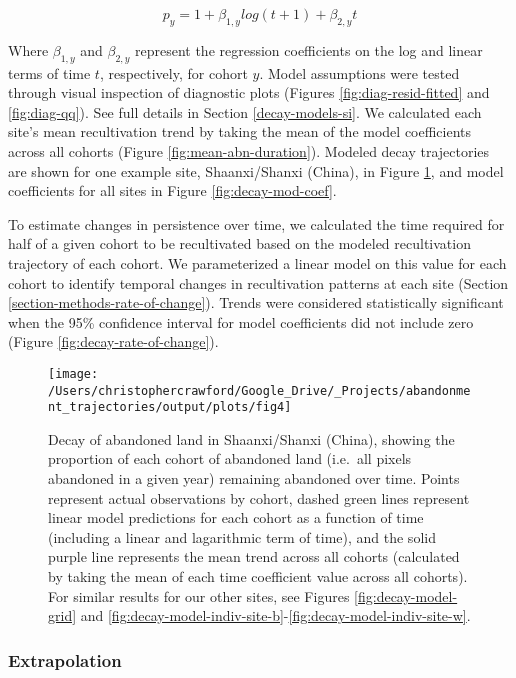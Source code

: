 \documentclass[9pt,twocolumn,twoside,]{pnas-new}
\begin{document}
\begin{equation}
p_{y} = 1 + \beta_{1,y} log(t + 1) + \beta_{2,y} t \label{eq:mod-spec}
\end{equation}

Where \(\beta_{1,y}\) and \(\beta_{2,y}\) represent the regression coefficients on the log and linear terms of time \(t\), respectively, for cohort \(y\).
Model assumptions were tested through visual inspection of diagnostic plots (Figures \ref{fig:diag-resid-fitted} and \ref{fig:diag-qq}).
See full details in Section \ref{decay-models-si}.
We calculated each site's mean recultivation trend by taking the mean of the model coefficients across all cohorts (Figure \ref{fig:mean-abn-duration}).
Modeled decay trajectories are shown for one example site, Shaanxi/Shanxi (China), in Figure \ref{fig:abn-decay-s}, and model coefficients for all sites in Figure \ref{fig:decay-mod-coef}.

To estimate changes in persistence over time, we calculated the time required for half of a given cohort to be recultivated based on the modeled recultivation trajectory of each cohort.
We parameterized a linear model on this value for each cohort to identify temporal changes in recultivation patterns at each site (Section \ref{section-methods-rate-of-change}).
Trends were considered statistically significant when the 95\% confidence interval for model coefficients did not include zero (Figure \ref{fig:decay-rate-of-change}).



\begin{figure}
\texttt{[image: /Users/christophercrawford/Google\_Drive/\_Projects/abandonment\_trajectories/output/plots/fig4]} \caption{Decay of abandoned land in Shaanxi/Shanxi (China), showing the proportion of each cohort of abandoned land (i.e.~all pixels abandoned in a given year) remaining abandoned over time. Points represent actual observations by cohort, dashed green lines represent linear model predictions for each cohort as a function of time (including a linear and lagarithmic term of time), and the solid purple line represents the mean trend across all cohorts (calculated by taking the mean of each time coefficient value across all cohorts). For similar results for our other sites, see Figures \ref{fig:decay-model-grid} and \ref{fig:decay-model-indiv-site-b}-\ref{fig:decay-model-indiv-site-w}.}\label{fig:abn-decay-s}
\end{figure}

\hypertarget{extrapolation}{%
\subsubsection{Extrapolation}\label{extrapolation}}
\end{document}

